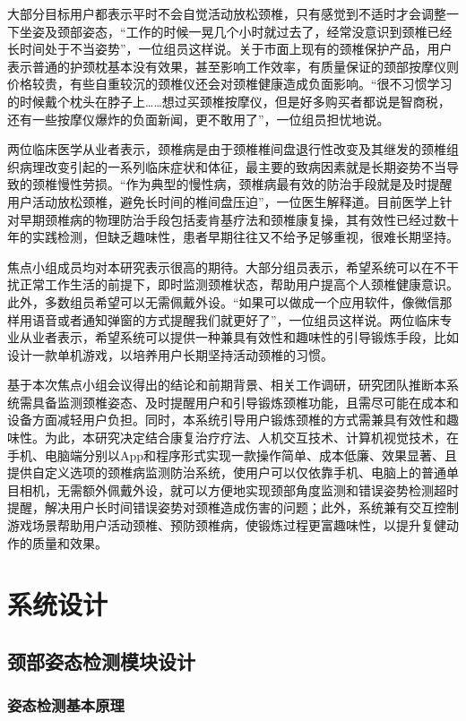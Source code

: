 \documentclass[12pt,a4paper]{article}%
\begin{document}
大部分目标用户都表示平时不会自觉活动放松颈椎，只有感觉到不适时才会调整一下坐姿及颈部姿态，“工作的时候一晃几个小时就过去了，经常没意识到颈椎已经长时间处于不当姿势”，一位组员这样说。关于市面上现有的颈椎保护产品，用户表示普通的护颈枕基本没有效果，甚至影响工作效率，有质量保证的颈部按摩仪则价格较贵，有些自重较沉的颈椎仪还会对颈椎健康造成负面影响。“很不习惯学习的时候戴个枕头在脖子上……想过买颈椎按摩仪，但是好多购买者都说是智商税，还有一些按摩仪爆炸的负面新闻，更不敢用了”，一位组员担忧地说。


两位临床医学从业者表示，颈椎病是由于颈椎椎间盘退行性改变及其继发的颈椎组织病理改变引起的一系列临床症状和体征，最主要的致病因素就是长期姿势不当导致的颈椎慢性劳损。“作为典型的慢性病，颈椎病最有效的防治手段就是及时提醒用户活动放松颈椎，避免长时间的椎间盘压迫”，一位医生解释道。目前医学上针对早期颈椎病的物理防治手段包括麦肯基疗法和颈椎康复操，其有效性已经过数十年的实践检测，但缺乏趣味性，患者早期往往又不给予足够重视，很难长期坚持。


焦点小组成员均对本研究表示很高的期待。大部分组员表示，希望系统可以在不干扰正常工作生活的前提下，即时监测颈椎状态，帮助用户提高个人颈椎健康意识。此外，多数组员希望可以无需佩戴外设。“如果可以做成一个应用软件，像微信那样用语音或者通知弹窗的方式提醒我们就更好了”，一位组员这样说。两位临床专业从业者表示，希望系统可以提供一种兼具有效性和趣味性的引导锻炼手段，比如设计一款单机游戏，以培养用户长期坚持活动颈椎的习惯。


基于本次焦点小组会议得出的结论和前期背景、相关工作调研，研究团队推断本系统需具备监测颈椎姿态、及时提醒用户和引导锻炼颈椎功能，且需尽可能在成本和设备方面减轻用户负担。同时，本系统引导用户锻炼颈椎的方式需兼具有效性和趣味性。为此，本研究决定结合康复治疗疗法、人机交互技术、计算机视觉技术，在手机、电脑端分别以App和程序形式实现一款操作简单、成本低廉、效果显著、且提供自定义选项的颈椎病监测防治系统，使用户可以仅依靠手机、电脑上的普通单目相机，无需额外佩戴外设，就可以方便地实现颈部角度监测和错误姿势检测超时提醒，解决用户长时间错误姿势对颈椎造成伤害的问题；此外，系统兼有交互控制游戏场景帮助用户活动颈椎、预防颈椎病，使锻炼过程更富趣味性，以提升复健动作的质量和效果。
\section{系统设计}

\subsection{颈部姿态检测模块设计}

\subsubsection{姿态检测基本原理}
\end{document}
